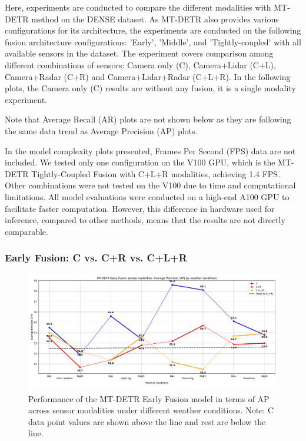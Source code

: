 \documentclass[report.tex]{subfiles}
\begin{document}
    Here, experiments are conducted to compare the different modalities with MT-DETR method on the DENSE dataset. As MT-DETR also provides various configurations for its architecture, the experiments are conducted on the following fusion architecture configurations: 'Early', 'Middle', and 'Tightly-coupled' with all available sensors in the dataset. The experiment covers comparison among different combinations of sensors: Camera only (C), Camera+Lidar (C+L), Camera+Radar (C+R) and Camera+Lidar+Radar (C+L+R). In the following plots, the Camera only (C) results are without any fusion, it is a single modality experiment.

    Note that Average Recall (AR) plots are not shown below as they are following the same data trend as Average Precision (AP) plots. 

    In the model complexity plots presented, Frames Per Second (FPS) data are not included. We tested only one configuration on the V100 GPU, which is the MT-DETR Tightly-Coupled Fusion with C+L+R modalities, achieving 1.4 FPS. Other combinations were not tested on the V100 due to time and computational limitations. All model evaluations were conducted on a high-end A100 GPU to facilitate faster computation. However, this difference in hardware used for inference, compared to other methods, means that the results are not directly comparable.

    \FloatBarrier
    \subsubsection{Early Fusion: C vs. C+R vs. C+L+R}

        \begin{figure}[]
            \centering
            \includegraphics[width=1.0\textwidth]{images/results/mtdetr/early/ap.pdf}
            \caption{Performance of the MT-DETR Early Fusion model in terms of AP across sensor modalities under different weather conditions. Note: C data point values are shown above the line and rest are below the line.}
            \label{fig:mtdetr_early_ap}
        \end{figure}
\end{document}
